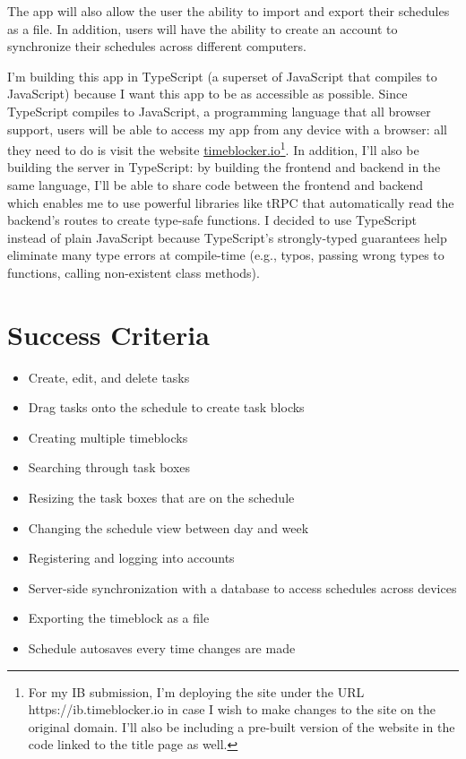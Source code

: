 \documentclass[12pt, notitlepage]{article}
\begin{document}
The app will also allow the user the ability to import and export their schedules as a file.
In addition, users will have the ability to create an account to synchronize their schedules across different computers.

I'm building this app in TypeScript (a superset of JavaScript that compiles to JavaScript) because I want this app to be as accessible as possible.
Since TypeScript compiles to JavaScript, a programming language that all browser support, users will be able to access my app from any device with a browser:
all they need to do is visit the website \href{https://ib.timeblocker.io}{timeblocker.io}\footnote{For my IB submission, I'm deploying the site under the URL https://ib.timeblocker.io in case I wish to make changes to the site on the original domain. I'll also be including a pre-built version of the website in the code linked to the title page as well.}.
In addition, I'll also be building the server in TypeScript:
by building the frontend and backend in the same language, I'll be able to share code between the frontend and backend which enables me to use powerful libraries like tRPC that automatically read the backend's routes to create type-safe functions.
I decided to use TypeScript instead of plain JavaScript because TypeScript's strongly-typed guarantees help eliminate many type errors at compile-time (e.g., typos, passing wrong types to functions, calling non-existent class methods).

\bigskip
{}

\section{Success Criteria}
\begin{itemize}
	\item Create, edit, and delete tasks
	\item Drag tasks onto the schedule to create task blocks
	\item Creating multiple timeblocks
	\item Searching through task boxes
	\item Resizing the task boxes that are on the schedule
	\item Changing the schedule view between day and week
	\item Registering and logging into accounts
	\item Server-side synchronization with a database to access schedules across devices
	\item Exporting the timeblock as a file
	\item Schedule autosaves every time changes are made
\end{itemize}
\end{document}

